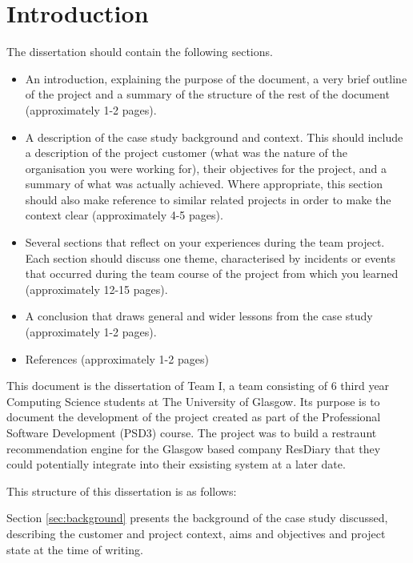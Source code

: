 \documentclass{l3proj}
\begin{document}
\section{Introduction}

The dissertation should contain the following sections.

\begin{itemize}
\item An introduction, explaining the purpose of the document, a very brief outline of the project and a summary of the structure of the rest of the document (approximately 1-2 pages).
\item A description of the case study background and context. This should include a description of the project customer (what was the nature of the organisation you were working for), their objectives for the project, and a summary of what was actually achieved. Where appropriate, this section should also make reference to similar related projects in order to make the context clear (approximately 4-5 pages).
\item Several sections that reflect on your experiences during the team project. Each section should discuss one theme, characterised by incidents or events that occurred during the team course of the project from which you learned (approximately 12-15 pages).
\item A conclusion that draws general and wider lessons from the case study (approximately 1-2 pages).
\item References (approximately 1-2 pages)
\end{itemize}

This document is the dissertation of Team I, a team consisting of 6 third year Computing Science students at The University of Glasgow. Its purpose is to document the development of the project created as part of the Professional Software Development (PSD3) course. The project was to build a restraunt recommendation engine for the Glasgow based company ResDiary that they could potentially integrate into their exsisting system at a later date.  

This structure of this dissertation is as follows:

Section \ref{sec:background} presents the background of the case study discussed, describing the customer and project context, aims and objectives and project state at the time of writing.  
\end{document}
